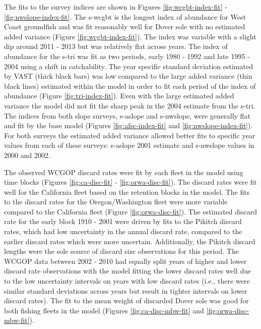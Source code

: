 \documentclass[11pt,
  english,
  a4paper,
]{article}
\begin{document}
\leavevmode\tagmcend\tagstructend\par


The fits to the survey indices are shown in Figures \ref{fig:wcgbt-index-fit} - \ref{fig:nwslope-index-fit}. The \gls{s-wcgbt} is the longest index of abundance for West Coast groundfish and was fit reasonably well for Dover sole with no estimated added variance (Figure \ref{fig:wcgbt-index-fit}). The index was variable with a slight dip around 2011 - 2013 but was relatively flat across years. The index of abundance for the \gls{s-tri} was fit as two periods, early 1980 - 1992 and late 1995 - 2004 using a shift in catchability. The year specific standard deviation estimated by VAST (thick black bars) was low compared to the large added variance (thin black lines) estimated within the model in order to fit each period of the index of abundance (Figure \ref{fig:tri-index-fit}). Even with the large estimated added variance the model did not fit the sharp peak in the 2004 estimate from the \gls{s-tri}. The indices from both slope surveys, \gls{s-aslope} and \gls{s-nwslope}, were generally flat and fit by the base model (Figures \ref{fig:afsc-index-fit} and \ref{fig:nwslope-index-fit}). For both surveys the estimated added variance allowed better fits to specific year values from each of these surveys: \gls{s-aslope} 2001 estimate and \gls{s-nwslope} values in 2000 and 2002.

\leavevmode\tagmcend\tagstructend\par


The observed WCGOP discard rates were fit by each fleet in the model using time blocks (Figures \ref{fig:ca-disc-fit} - \ref{fig:orwa-disc-fit}). The discard rates were fit well for the California fleet based on the retention blocks in the model. The fits to the discard rates for the Oregon/Washington fleet were more variable compared to the California fleet (Figure \ref{fig:orwa-disc-fit}). The estimated discard rate for the early block 1910 - 2001 were driven by fits to the Pikitch discard rates, which had low uncertainty in the annual discard rate, compared to the earlier discard rates which were more uncertain. Additionally, the Pikitch discard lengths were the sole source of discard size observations for this period. The WCGOP data between 2002 - 2010 had equally split years of higher and lower discard rate observations with the model fitting the lower discard rates well due to the low uncertainty intervals on years with low discard rates (i.e., there were similar standard deviations across years but result in tighter intervals on lower discard rates). The fit to the mean weight of discarded Dover sole was good for both fishing fleets in the model (Figures \ref{fig:ca-disc-mbw-fit} and \ref{fig:orwa-disc-mbw-fit}).
\end{document}
